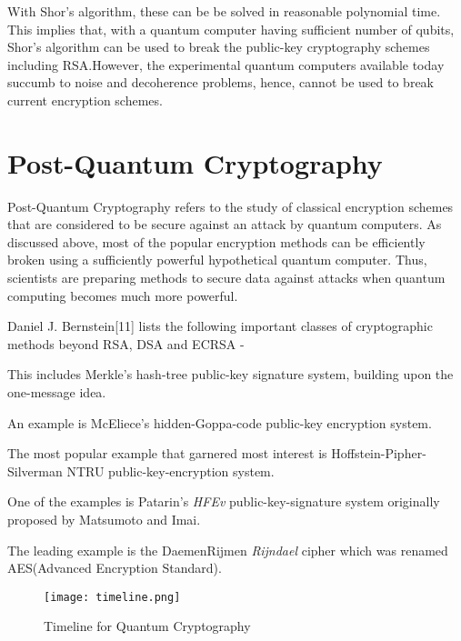 With Shor's algorithm, these can be be solved in reasonable polynomial time. This implies that, with a quantum computer having sufficient number of qubits, Shor's algorithm can be used to break the public-key cryptography schemes including RSA.However, the experimental quantum computers available today succumb to noise and decoherence problems, hence, cannot be used to break current encryption schemes.

\section{Post-Quantum Cryptography}
Post-Quantum Cryptography refers to the study of classical encryption schemes that are considered to be secure against an attack by quantum computers. As discussed above, most of the popular encryption methods can be efficiently broken using a sufficiently powerful hypothetical quantum computer. Thus, scientists are preparing methods to secure data against attacks when quantum computing becomes much more powerful.

Daniel J. Bernstein[11] lists the following important classes of cryptographic methods beyond RSA, DSA and ECRSA -
\begin{description}[align=left, style=multiline,leftmargin=4 cm]
\item [Hash-based - ] This includes Merkle's hash-tree public-key signature system, building upon the one-message idea.
\item [Code-based - ] An example is McEliece's hidden-Goppa-code public-key encryption system.
\item [Lattice-based - ] The most popular example that garnered most interest is Hoffstein-Pipher-Silverman NTRU public-key-encryption system.
\item [Multivariate quadratic equation based- ] One of the examples is Patarin's {\em HFEv} public-key-signature system originally proposed by Matsumoto and Imai.\\
\item [Secret-key based - ] The leading example is the DaemenRijmen
{\em Rijndael} cipher which was renamed AES(Advanced Encryption Standard).
\end{description}

\begin{figure}[H]
\centering
\texttt{[image: timeline.png]}
\caption{Timeline for Quantum Cryptography}\label{fig:timeline}
\end{figure}




